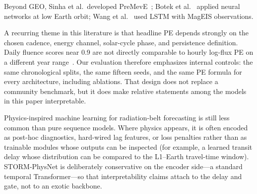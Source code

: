 \documentclass{ieeeaccess}
\begin{document}
Beyond GEO, Sinha et al.\ developed PreMevE~\cite{b25}; Botek
et al.~\cite{b26} applied neural networks at low Earth orbit; Wang et
al.~\cite{b12} used LSTM with MagEIS observations.

A recurring theme in this literature is that headline PE depends strongly on the
chosen cadence, energy channel, solar-cycle phase, and persistence definition.
Daily fluence scores near 0.9 are not directly comparable to hourly log-flux PE
on a different year range~\cite{b21,b22}. Our evaluation therefore emphasizes
internal controls: the same chronological splits, the same fifteen seeds, and the
same PE formula for every architecture, including ablations. That design does not
replace a community benchmark, but it does make relative statements among the
models in this paper interpretable.

Physics-inspired machine learning for radiation-belt forecasting is still less
common than pure sequence models. Where physics appears, it is often encoded as
post-hoc diagnostics, hard-wired lag features, or loss penalties rather than as
trainable modules whose outputs can be inspected (for example, a learned transit
delay whose distribution can be compared to the L1--Earth travel-time window).
STORM-PhysNet is deliberately conservative on the encoder side---a standard
temporal Transformer---so that interpretability claims attach to the delay and
gate, not to an exotic backbone.
\end{document}
